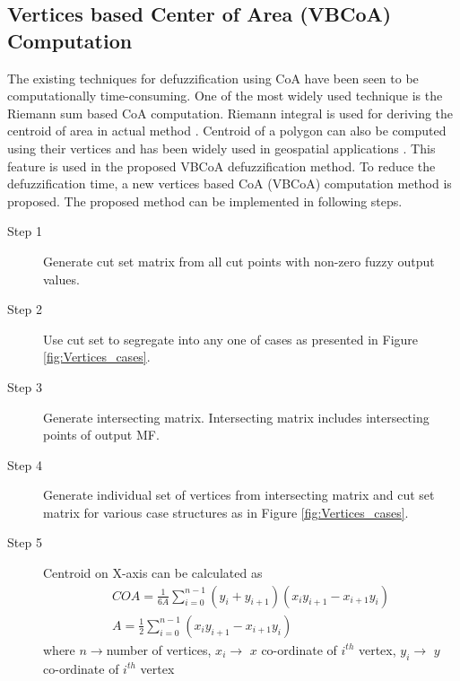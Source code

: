 \subsection{Vertices based Center of Area (VBCoA) Computation}
The existing techniques for defuzzification using CoA have been seen to be computationally time-consuming. One of the most widely used technique is the Riemann sum based CoA computation. Riemann integral is used for deriving the centroid of area in actual method \cite{Patel2002,Leekwijck1999}. Centroid of a polygon can also be computed using their vertices and has been widely used in geospatial applications \cite{Stankute2010}. This feature is used in the proposed VBCoA defuzzification method. To reduce the defuzzification time, a new vertices based CoA (VBCoA) computation method is proposed. The proposed method can be implemented in following steps.
\begin{description}
	\item[Step 1] Generate cut set matrix from all cut points with non-zero fuzzy output values.
	\item[Step 2] Use cut set to segregate into any one of cases as presented in Figure \ref{fig:Vertices_cases}.
	\item[Step 3] Generate intersecting matrix. Intersecting matrix includes intersecting points of output MF.
	\item[Step 4] Generate individual set of vertices from intersecting matrix and cut set matrix for various case structures as in Figure \ref{fig:Vertices_cases}.
	\item[Step 5] Centroid on X-axis can be calculated as 
	\[\begin{array}{l}
	COA = \frac{1}{{6A}}\sum\limits_{i = 0}^{n - 1} {\left( {{y_i} + {y_{i + 1}}} \right)} \left( {{x_i}{y_{i + 1}} - {x_{i + 1}}{y_i}} \right)\\
	A = \frac{1}{2}\sum\limits_{i = 0}^{n - 1} {\left( {{x_i}{y_{i + 1}} - {x_{i + 1}}{y_i}} \right)} 
	\end{array}\]
	where $n\rightarrow $number of vertices, $ x_i\rightarrow $ $ x $ co-ordinate of $ i^{th} $ vertex, $ y_i\rightarrow $ $ y $ co-ordinate of $ i^{th} $ vertex
\end{description}

